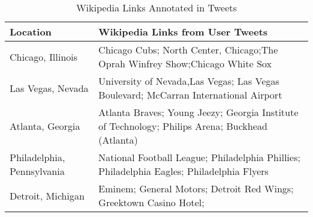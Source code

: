 \begin{table}
\begin{tabular}{|p{3cm}|p{8cm}|}
\hline
\textbf{Location}&{\textbf{Wikipedia Links from User Tweets}}\\
\hline
{Chicago, Illinois}&{Chicago Cubs; North Center, Chicago;The Oprah Winfrey Show;Chicago White Sox}\\
\hline
{Las Vegas, Nevada}&{University of Nevada,Las Vegas; Las Vegas Boulevard; McCarran International Airport}\\
\hline
{Atlanta, Georgia}&{Atlanta Braves; Young Jeezy; Georgia Institute of Technology; Philips Arena; Buckhead (Atlanta)}\\
\hline
{Philadelphia, Pennsylvania}&{National Football League; Philadelphia Phillies; Philadelphia Eagles; Philadelphia Flyers}\\
\hline
{Detroit, Michigan}&{Eminem; General Motors; Detroit Red Wings; Greektown Casino Hotel;}\\
\hline
\end{tabular}
\caption{Wikipedia Links Annotated in Tweets}
\label{table:wikilinks}
\end{table}



